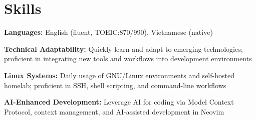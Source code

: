 \section{Skills}

\begin{onecolentry}
	\textbf{Languages:}
	English (fluent, TOEIC:\@ 870/990),
	Vietnamese (native)
\end{onecolentry}

\vspace{0.2cm}

\begin{onecolentry}
	\textbf{Technical Adaptability:}
	Quickly learn and adapt to emerging technologies; proficient in integrating new tools and workflows into
	development environments
\end{onecolentry}

\vspace{0.2cm}

\begin{onecolentry}
	\textbf{Linux Systems:}
	Daily usage of GNU/Linux environments and self-hosted homelab; proficient in SSH, shell scripting, and
	command-line workflows
\end{onecolentry}

\vspace{0.2cm}

\begin{onecolentry}
	\textbf{AI-Enhanced Development:}
	Leverage AI for coding via Model Context Protocol, context management, and AI-assisted development in Neovim
\end{onecolentry}
